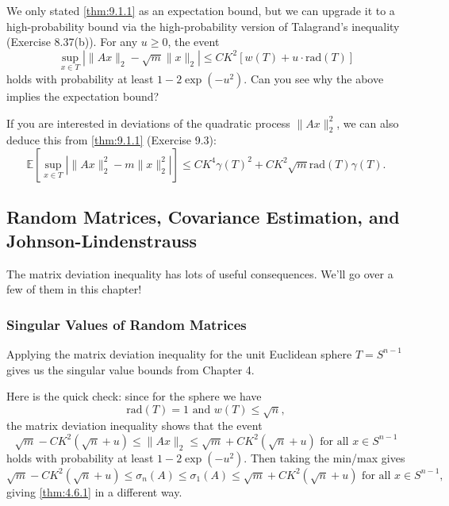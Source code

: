 \begin{remark}
\label{rmk:9.1.4}
We only stated \cref{thm:9.1.1} as an expectation bound, but we can upgrade it to a high-probability bound via 
the high-probability version of Talagrand's inequality (Exercise 8.37(b)). For any $u \geq 0$, the event 
\[ \sup_{x \in T} \left| \lVert Ax \rVert_{2} - \sqrt{m}\lVert x \rVert_{2} \right| 
\leq CK^2 [w(T) + u \cdot \mathrm{rad}(T)] \]
holds with probability at least $1 - 2 \exp{(-u^2)}$. Can you see why the above implies the expectation bound?
\end{remark}

\begin{remark}
\label{rmk:9.1.5}
If you are interested in deviations of the quadratic process $\lVert Ax \rVert_{2}^2$, we can also deduce this 
from \cref{thm:9.1.1} (Exercise 9.3):
\[ \mathbb{E}\left[ \sup_{x \in T} \left| \lVert Ax \rVert_{2}^2 - m \lVert x \rVert_{2}^2 \right| \right] 
\leq CK^4 \gamma(T)^2 + CK^2 \sqrt{m} \mathrm{rad}(T) \gamma(T). \]
\end{remark}



\subsection{Random Matrices, Covariance Estimation, and Johnson-Lindenstrauss}
The matrix deviation inequality has lots of useful consequences. We'll go over a few of them in this chapter!


\subsubsection{Singular Values of Random Matrices}
Applying the matrix deviation inequality for the unit Euclidean sphere $T = S^{n - 1}$ gives us the singular 
value bounds from Chapter 4.

Here is the quick check: since for the sphere we have 
\[ \mathrm{rad}(T) = 1 \text{ and } w(T) \leq \sqrt{n}, \]
the matrix deviation inequality shows that the event 
\[ \sqrt{m} - CK^2 (\sqrt{n} + u) \leq \lVert Ax \rVert_{2} \leq \sqrt{m} + CK^2 (\sqrt{n} + u) \text{ for 
all } x \in S^{n - 1} \]
holds with probability at least $1 - 2 \exp{(-u^2)}$. Then taking the min/max gives 
\[ \sqrt{m} - CK^2 (\sqrt{n} + u) \leq \sigma_n(A) \leq \sigma_1(A) \leq \sqrt{m} + CK^2 (\sqrt{n} + u) 
\text{ for all } x \in S^{n - 1}, \]
giving \cref{thm:4.6.1} in a different way.


